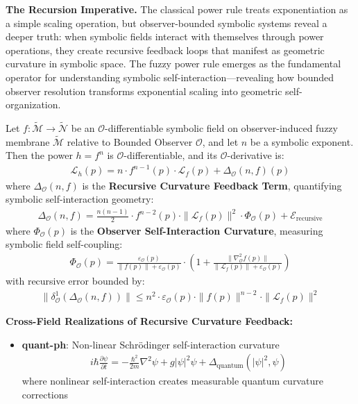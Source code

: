 \textbf{The Recursion Imperative.} The classical power rule treats exponentiation as a simple scaling operation, but observer-bounded symbolic systems reveal a deeper truth: when symbolic fields interact with themselves through power operations, they create recursive feedback loops that manifest as geometric curvature in symbolic space. The fuzzy power rule emerges as the fundamental operator for understanding symbolic self-interaction—revealing how bounded observer resolution transforms exponential scaling into geometric self-organization.

\begin{theorem}
\label{theorem:bk4_fuzzy_power_rule}
Let $f: \tilde{\mathcal{M}} \rightarrow \tilde{\mathcal{N}}$ be an $\mathcal{O}$-differentiable symbolic field on observer-induced fuzzy membrane $\tilde{\mathcal{M}}$ relative to Bounded Observer $\mathcal{O}$, and let $n$ be a symbolic exponent. Then the power $h = f^n$ is $\mathcal{O}$-differentiable, and its $\mathcal{O}$-derivative is:
\begin{align}
\mathcal{L}_h(p) = n \cdot f^{n-1}(p) \cdot \mathcal{L}_f(p) + \Delta_{\mathcal{O}}(n, f)(p)
\end{align}
where $\Delta_{\mathcal{O}}(n, f)$ is the \textbf{Recursive Curvature Feedback Term}, quantifying symbolic self-interaction geometry:
\begin{align}
\Delta_{\mathcal{O}}(n, f) = \frac{n(n-1)}{2} \cdot f^{n-2}(p) \cdot \|\mathcal{L}_f(p)\|^2 \cdot \Phi_{\mathcal{O}}(p) + \mathcal{E}_{\text{recursive}}
\end{align}
where $\Phi_{\mathcal{O}}(p)$ is the \textbf{Observer Self-Interaction Curvature}, measuring symbolic field self-coupling:
\begin{align}
\Phi_{\mathcal{O}}(p) = \frac{\varepsilon_{\mathcal{O}}(p)}{\|f(p)\| + \varepsilon_{\mathcal{O}}(p)} \cdot \left(1 + \frac{\|\nabla_{\mathcal{O}}^2 f(p)\|}{\|\mathcal{L}_f(p)\| + \varepsilon_{\mathcal{O}}(p)}\right)
\end{align}
with recursive error bounded by:
\begin{align}
\|\delta^1_{\mathcal{O}}(\Delta_{\mathcal{O}}(n, f))\| \leq n^2 \cdot \varepsilon_{\mathcal{O}}(p) \cdot \|f(p)\|^{n-2} \cdot \|\mathcal{L}_f(p)\|^2
\end{align}

\textbf{Cross-Field Realizations of Recursive Curvature Feedback:}

\begin{itemize}
\item \textbf{quant-ph}: Non-linear Schrödinger self-interaction curvature
  \begin{align}
  i\hbar \frac{\partial \psi}{\partial t} = -\frac{\hbar^2}{2m}\nabla^2 \psi + g|\psi|^2 \psi + \Delta_{\text{quantum}}(|\psi|^2, \psi)
  \end{align}
  where nonlinear self-interaction creates measurable quantum curvature corrections
  

\end{itemize}
\end{theorem}
